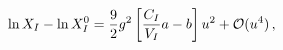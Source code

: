 \begin{equation}
\ln X_I - \ln X_I^0 = \frac 92 g^2 \left[\frac{C_I}{V_I} a - b\right] u^2 + {\cal O}(u^4)\,,
                      \label{expansionscal}
\end{equation}

